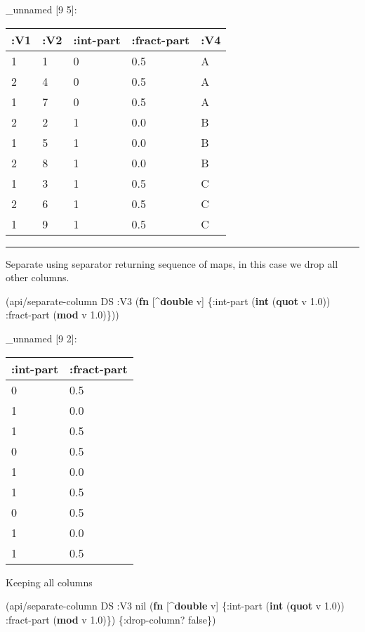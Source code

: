 \documentclass[]{article}
\newenvironment{Shaded}{\begin{snugshade}}{\end{snugshade}}
\newcommand{\AttributeTok}[1]{\textcolor[rgb]{0.77,0.63,0.00}{#1}}
\newcommand{\FloatTok}[1]{\textcolor[rgb]{0.00,0.00,0.81}{#1}}
\newcommand{\KeywordTok}[1]{\textcolor[rgb]{0.13,0.29,0.53}{\textbf{#1}}}
\newcommand{\NormalTok}[1]{#1}
\newcommand{\VariableTok}[1]{\textcolor[rgb]{0.00,0.00,0.00}{#1}}
\begin{document}
\_unnamed {[}9 5{]}:

\begin{longtable}[]{@{}lllll@{}}
\toprule
:V1 & :V2 & :int-part & :fract-part & :V4\tabularnewline
\midrule
\endhead
1 & 1 & 0 & 0.5 & A\tabularnewline
2 & 4 & 0 & 0.5 & A\tabularnewline
1 & 7 & 0 & 0.5 & A\tabularnewline
2 & 2 & 1 & 0.0 & B\tabularnewline
1 & 5 & 1 & 0.0 & B\tabularnewline
2 & 8 & 1 & 0.0 & B\tabularnewline
1 & 3 & 1 & 0.5 & C\tabularnewline
2 & 6 & 1 & 0.5 & C\tabularnewline
1 & 9 & 1 & 0.5 & C\tabularnewline
\bottomrule
\end{longtable}

\begin{center}\rule{0.5\linewidth}{0.5pt}\end{center}

Separate using separator returning sequence of maps, in this case we
drop all other columns.

\begin{Shaded}
\begin{Highlighting}[]
\NormalTok{(api/separate-column DS }\AttributeTok{:V3}\NormalTok{ (}\KeywordTok{fn}\NormalTok{ [^}\KeywordTok{double}\NormalTok{ v]}
\NormalTok{                              \{}\AttributeTok{:int-part}\NormalTok{ (}\KeywordTok{int}\NormalTok{ (}\KeywordTok{quot}\NormalTok{ v }\FloatTok{1.0}\NormalTok{))}
                               \AttributeTok{:fract-part}\NormalTok{ (}\KeywordTok{mod}\NormalTok{ v }\FloatTok{1.0}\NormalTok{)\}))}
\end{Highlighting}
\end{Shaded}

\_unnamed {[}9 2{]}:

\begin{longtable}[]{@{}ll@{}}
\toprule
:int-part & :fract-part\tabularnewline
\midrule
\endhead
0 & 0.5\tabularnewline
1 & 0.0\tabularnewline
1 & 0.5\tabularnewline
0 & 0.5\tabularnewline
1 & 0.0\tabularnewline
1 & 0.5\tabularnewline
0 & 0.5\tabularnewline
1 & 0.0\tabularnewline
1 & 0.5\tabularnewline
\bottomrule
\end{longtable}

Keeping all columns

\begin{Shaded}
\begin{Highlighting}[]
\NormalTok{(api/separate-column DS }\AttributeTok{:V3} \VariableTok{nil}\NormalTok{ (}\KeywordTok{fn}\NormalTok{ [^}\KeywordTok{double}\NormalTok{ v]}
\NormalTok{                                  \{}\AttributeTok{:int-part}\NormalTok{ (}\KeywordTok{int}\NormalTok{ (}\KeywordTok{quot}\NormalTok{ v }\FloatTok{1.0}\NormalTok{))}
                                   \AttributeTok{:fract-part}\NormalTok{ (}\KeywordTok{mod}\NormalTok{ v }\FloatTok{1.0}\NormalTok{)\}) \{}\AttributeTok{:drop-column}\NormalTok{? }\VariableTok{false}\NormalTok{\})}
\end{Highlighting}
\end{Shaded}
\end{document}
